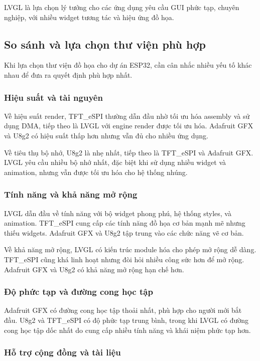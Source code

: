 LVGL là lựa chọn lý tưởng cho các ứng dụng yêu cầu GUI phức tạp, chuyên nghiệp, với nhiều widget tương tác và hiệu ứng đồ họa.

\subsection{So sánh và lựa chọn thư viện phù hợp}

Khi lựa chọn thư viện đồ họa cho dự án ESP32, cần cân nhắc nhiều yếu tố khác nhau để đưa ra quyết định phù hợp nhất.

\subsubsection{Hiệu suất và tài nguyên}

Về hiệu suất render, TFT\_eSPI thường dẫn đầu nhờ tối ưu hóa assembly và sử dụng DMA, tiếp theo là LVGL với engine render được tối ưu hóa. Adafruit GFX và U8g2 có hiệu suất thấp hơn nhưng vẫn đủ cho nhiều ứng dụng.

Về tiêu thụ bộ nhớ, U8g2 là nhẹ nhất, tiếp theo là TFT\_eSPI và Adafruit GFX. LVGL yêu cầu nhiều bộ nhớ nhất, đặc biệt khi sử dụng nhiều widget và animation, nhưng vẫn được tối ưu hóa cho hệ thống nhúng.

\subsubsection{Tính năng và khả năng mở rộng}

LVGL dẫn đầu về tính năng với bộ widget phong phú, hệ thống styles, và animation. TFT\_eSPI cung cấp các tính năng đồ họa cơ bản mạnh mẽ nhưng thiếu widgets. Adafruit GFX và U8g2 tập trung vào các chức năng vẽ cơ bản.

Về khả năng mở rộng, LVGL có kiến trúc module hóa cho phép mở rộng dễ dàng. TFT\_eSPI cũng khá linh hoạt nhưng đòi hỏi nhiều công sức hơn để mở rộng. Adafruit GFX và U8g2 có khả năng mở rộng hạn chế hơn.

\subsubsection{Độ phức tạp và đường cong học tập}

Adafruit GFX có đường cong học tập thoải nhất, phù hợp cho người mới bắt đầu. U8g2 và TFT\_eSPI có độ phức tạp trung bình, trong khi LVGL có đường cong học tập dốc nhất do cung cấp nhiều tính năng và khái niệm phức tạp hơn.

\subsubsection{Hỗ trợ cộng đồng và tài liệu}

